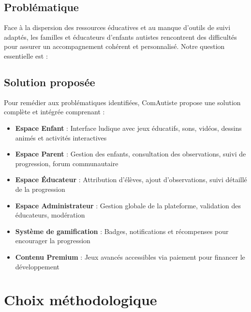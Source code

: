 \documentclass[12pt,a4paper]{report}
\begin{document}
\subsection{Problématique}

Face à la dispersion des ressources éducatives et au manque d'outils de suivi adaptés, les familles et éducateurs d'enfants autistes rencontrent des difficultés pour assurer un accompagnement cohérent et personnalisé. Notre question essentielle est :

\begin{center}
\end{center}

\subsection{Solution proposée}

Pour remédier aux problématiques identifiées, ComAutiste propose une solution complète et intégrée comprenant :

\begin{itemize}
    \item \textbf{Espace Enfant} : Interface ludique avec jeux éducatifs, sons, vidéos, dessins animés et activités interactives
    \item \textbf{Espace Parent} : Gestion des enfants, consultation des observations, suivi de progression, forum communautaire
    \item \textbf{Espace Éducateur} : Attribution d'élèves, ajout d'observations, suivi détaillé de la progression
    \item \textbf{Espace Administrateur} : Gestion globale de la plateforme, validation des éducateurs, modération
    \item \textbf{Système de gamification} : Badges, notifications et récompenses pour encourager la progression
    \item \textbf{Contenu Premium} : Jeux avancés accessibles via paiement pour financer le développement
\end{itemize}

\section{Choix méthodologique}
\end{document}
